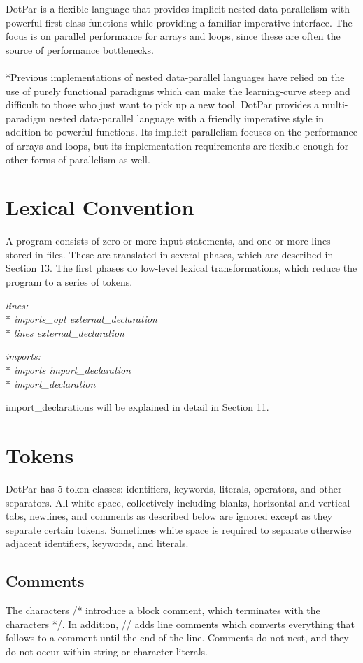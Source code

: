 DotPar is a flexible language that provides implicit nested data parallelism with powerful first-class functions while providing a familiar imperative interface. The focus is on parallel performance for arrays and loops, since these are often the source of performance bottlenecks.
\\ \\*Previous implementations of nested data-parallel languages have relied on the use of purely functional paradigms which can make the learning-curve steep and difficult to those who just want to pick up a new tool. DotPar provides a multi-paradigm nested data-parallel language with a friendly imperative style in addition to powerful functions. Its implicit parallelism focuses on the performance of arrays and loops, but its implementation requirements are flexible enough for other forms of parallelism as well.

\section{Lexical Convention}
A program consists of zero or more input statements, and one or more lines stored in files. These are translated in several phases, which are described in Section 13. The first phases do low-level lexical transformations, which reduce the program to a series of tokens.

\tab \emph{lines:} 
\\* \tab \tab \tab \textit{imports\_opt external\_declaration}
\\* \tab \tab \tab \emph{lines external\_declaration}

 \tab \emph{imports:}
\\* \tab \tab \tab \textit{imports import\_declaration}
\\* \tab \tab \tab \textit{import\_declaration}

import\_declarations will be explained in detail in Section 11.

\section{Tokens}
DotPar has 5 token classes: identifiers, keywords, literals, operators, and other separators. All white space, collectively including blanks, horizontal and vertical tabs, newlines, and comments as described below are ignored except as they separate certain tokens. Sometimes white space is required to separate otherwise adjacent identifiers, keywords, and literals.
\subsection{Comments}
The characters /* introduce a block comment, which terminates with the characters */. In addition, // adds line comments which converts everything that follows to a comment until the end of the line. Comments do not nest, and they do not occur within string or character literals.
